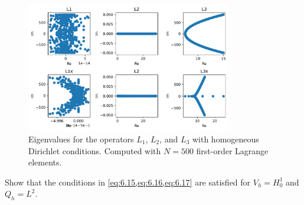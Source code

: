 \begin{solution}{5.6}
    \begin{figure}[ht]
        \centering
        \includegraphics[width=0.8\textwidth]{eigs.pdf}
        \caption{Eigenvalues for the operators $L_1$, $L_2$, and $L_3$ with homogeneous Dirichlet conditions. Computed with $N = 500$ first-order Lagrange elements.\label{fig:eigenvalues}}
    \end{figure}
\end{solution}

\begin{exercise}{6.1}\label{ex:6.1}
    Show that the conditions in \cref{eq:6.15,eq:6.16,eq:6.17} are satisfied for $V_h = H^1_0$ and $Q_h = L^2$.
\end{exercise}

